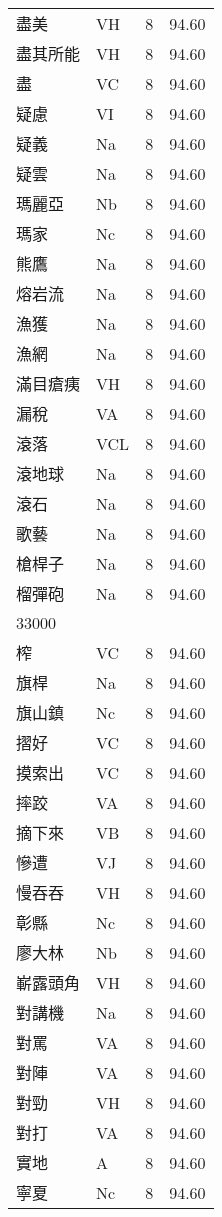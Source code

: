 \documentclass[twocolumn]{book}
\begin{document}
\begin{supertabular}{llrr}
盡美 & VH & 8 &  94.60\\
盡其所能 & VH & 8 &  94.60\\
盡 & VC & 8 &  94.60\\
疑慮 & VI & 8 &  94.60\\
疑義 & Na & 8 &  94.60\\
疑雲 & Na & 8 &  94.60\\
瑪麗亞 & Nb & 8 &  94.60\\
瑪家 & Nc & 8 &  94.60\\
熊鷹 & Na & 8 &  94.60\\
熔岩流 & Na & 8 &  94.60\\
漁獲 & Na & 8 &  94.60\\
漁網 & Na & 8 &  94.60\\
滿目瘡痍 & VH & 8 &  94.60\\
漏稅 & VA & 8 &  94.60\\
滾落 & VCL & 8 &  94.60\\
滾地球 & Na & 8 &  94.60\\
滾石 & Na & 8 &  94.60\\
歌藝 & Na & 8 &  94.60\\
槍桿子 & Na & 8 &  94.60\\
榴彈砲 & Na & 8 &  94.60\\
33000\\
榨 & VC & 8 &  94.60\\
旗桿 & Na & 8 &  94.60\\
旗山鎮 & Nc & 8 &  94.60\\
摺好 & VC & 8 &  94.60\\
摸索出 & VC & 8 &  94.60\\
摔跤 & VA & 8 &  94.60\\
摘下來 & VB & 8 &  94.60\\
慘遭 & VJ & 8 &  94.60\\
慢吞吞 & VH & 8 &  94.60\\
彰縣 & Nc & 8 &  94.60\\
廖大林 & Nb & 8 &  94.60\\
嶄露頭角 & VH & 8 &  94.60\\
對講機 & Na & 8 &  94.60\\
對罵 & VA & 8 &  94.60\\
對陣 & VA & 8 &  94.60\\
對勁 & VH & 8 &  94.60\\
對打 & VA & 8 &  94.60\\
實地 & A & 8 &  94.60\\
寧夏 & Nc & 8 &  94.60\\

\end{supertabular}
\end{document}
